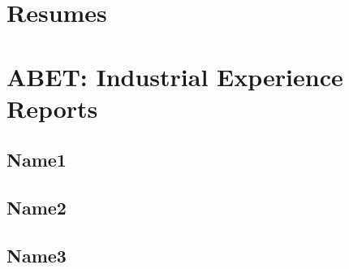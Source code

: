 

\section{Resumes}




%     
%     
%     

\section{ABET:  Industrial Experience Reports}

\subsection{Name1}

% 

\subsection{Name2}

% 

\subsection{Name3}

% 


